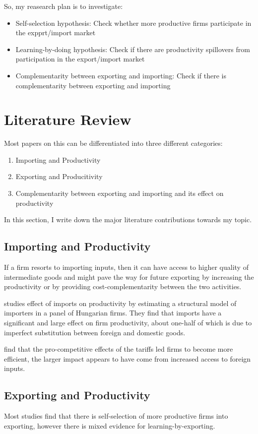 \documentclass[11pt]{article}
\begin{document}
So, my reasearch plan is to investigate:
\begin{itemize}
\item Self-selection hypothesis: Check whether more productive firms
  participate in the expprt/import market
\item Learning-by-doing hypothesis: Check if there are productivity
  spillovers from participation in the export/import market
\item Complementarity between exporting and importing: Check if there
  is complementarity between exporting and importing 
\end{itemize}

\section{Literature Review}
Most papers on this can be differentiated into three different
categories:
\begin{enumerate}
\item Importing and Productivity 
\item Exporting and Producitivity
\item Complementarity between exporting and importing and its effect
  on productivity
\end{enumerate}
In this section, I write down the major literature contributions
towards my topic. 
\subsection{Importing and Productivity}
If a firm resorts to importing inputs, then it can have access to
higher quality of intermediate goods and might pave the way for future
exporting by increasing the productivity or by providing
cost-complementarity between the two activities.  

\textcite{halpern2011imported} studies effect of imports on productivity by estimating a structural
model of importers in a panel of Hungarian firms. They find that imports have
a significant and large effect on firm productivity, about one-half of which is due
to imperfect substitution between foreign and domestic goods. 

\textcite{topalova2011trade} find that the pro-competitive
effects of the tariffs led firms to become more
efficient, the larger impact appears to have come from 
increased access to foreign inputs.
\subsection{Exporting and Productivity}
Most studies find that there is self-selection of more productive
firms into exporting, however there is mixed evidence for
learning-by-exporting. 
\end{document}
